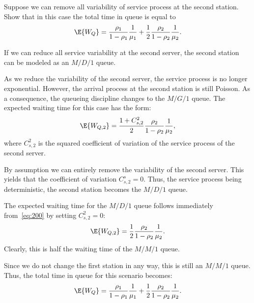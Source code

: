\begin{exercise}
Suppose we can remove all variability of  service process at the second station. Show that in this case the total time in queue is equal to
\begin{equation*}
  \E{W_Q}= \frac{\rho_1}{1-\rho_1} \frac1{\mu_1} +
  \frac12\frac{\rho_2}{1-\rho_2} \frac1{\mu_2}.
\end{equation*}
\begin{hint}
  If we can reduce all service variability at the second server, the second station can be modeled as an $M/D/1$ queue.
\end{hint}
\begin{solution}
As we reduce the variability of the second server, the service process
is no longer exponential. However, the arrival process at the second
station is still Poisson. As a consequence, the queueing discipline
changes to the $M/G/1$ queue. The expected waiting time for this case
has the form:
\begin{equation}\label{eq:200}
\E{W_{Q,2}} = \frac{1+C_{s,2}^2}2\frac{\rho_2}{1-\rho_2} \frac1{\mu_2},
\end{equation}
where $C_{s,2}^2$ is the squared coefficient of variation of the
service process of the second server.

By assumption we can entirely remove the variability of the second server.
This yields that the coefficient of variation $C_{s,2}^s = 0$.
Thus, the service process being deterministic, the second station becomes the $M/D/1$ queue.

The expected waiting time for the $M/D/1$ queue follows immediately
from~\cref{eq:200} by setting $C_{s,2}^2 =0$:
\begin{equation}\label{eq:300}
\E{W_{Q,2}} = \frac{1}2\frac{\rho_2}{1-\rho_2} \frac1{\mu_2}.
\end{equation}
Clearly, this is half the waiting time of the  $M/M/1$ queue. 

Since we do not change the first station in any way, this is still an
$M/M/1$ queue. 
Thus, the total time in queue for this scenario becomes:
\begin{equation*}
  \E{W_Q}= \frac{\rho_1}{1-\rho_1} \frac1{\mu_1} +
  \frac12\frac{\rho_2}{1-\rho_2} \frac1{\mu_2}. 
\end{equation*}
\end{solution}
\end{exercise}

